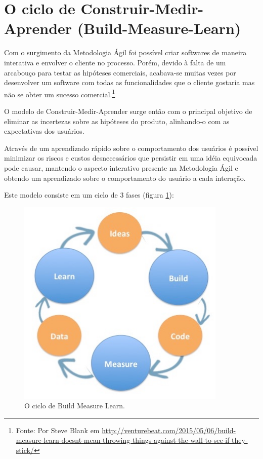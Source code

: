 \section{O ciclo de Construir-Medir-Aprender (Build-Measure-Learn)}
\par Com o surgimento da Metodologia Ágil foi possível criar softwares de maneira interativa e envolver o cliente no processo. Porém, devido à falta de um arcabouço para testar as hipóteses comerciais, acabava-se muitas vezes por desenvolver um software com todas as funcionalidades que o cliente gostaria mas não se obter um sucesso comercial.\footnote{Fonte: Por Steve Blank em \url{http://venturebeat.com/2015/05/06/build-measure-learn-doesnt-mean-throwing-things-against-the-wall-to-see-if-they-stick/}}
\par O modelo de Construir-Medir-Aprender surge então com o principal objetivo de eliminar as incertezas sobre as hipóteses do produto, alinhando-o com as expectativas dos usuários.
\par Através de um aprendizado rápido sobre o comportamento dos usuários é possível minimizar os riscos e custos desnecessários que persistir em uma idéia equivocada pode causar, mantendo o aspecto interativo presente na Metodologia Ágil e obtendo um aprendizado sobre o comportamento do usuário a cada interação.
\par Este modelo consiste em um ciclo de 3 fases (figura \ref{fig:buildmeasurelearn}):
\begin{figure}[htb]
\centering
\includegraphics[width=10cm]{figuras/buildmeasurelearn}
\caption{\label{fig:buildmeasurelearn}O ciclo de Build Measure Learn.}
\end{figure}
